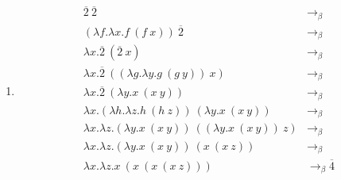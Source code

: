 \begin{enumerate}
          \begin{solution}
              \begin{enumerate}
                  \item \begin{align*}
                            \overline{2}\ \overline{2}                                            & \to_\beta              \\
                            (\lambda f.\lambda x.f\ (f\ x))\ \overline{2}                         & \to_\beta              \\
                            \lambda x.\overline{2}\ (\overline{2}\ x)                             & \to_\beta              \\
                            \lambda x.\overline{2}\ ((\lambda g.\lambda y.g\ (g\ y))\ x)          & \to_\beta              \\
                            \lambda x.\overline{2}\ (\lambda y.x\ (x\ y))                         & \to_\beta              \\
                            \lambda x.(\lambda h.\lambda z.h\ (h\ z))\ (\lambda y.x\ (x\ y))      & \to_\beta              \\
                            \lambda x.\lambda z.(\lambda y.x\ (x\ y))\ ((\lambda y.x\ (x\ y))\ z) & \to_\beta              \\
                            \lambda x.\lambda z.(\lambda y.x\ (x\ y))\ (x\ (x\ z))                & \to_\beta              \\
                            \lambda x.\lambda z.x\ (x\ (x\ (x\ z)))                               & \to_\beta \overline{4} \\
                        \end{align*}
              \end{enumerate}
          \end{solution}


\end{enumerate}
